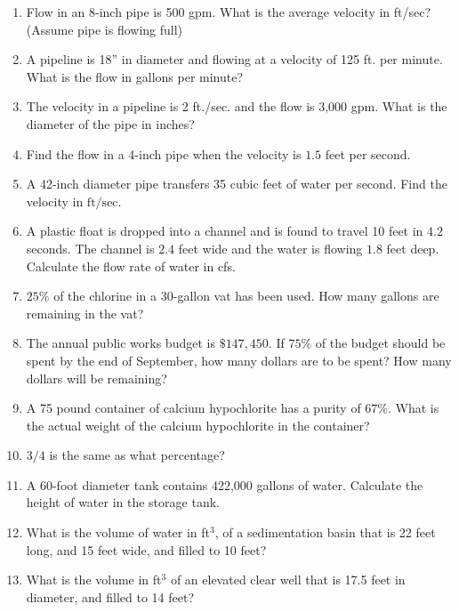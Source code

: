 \begin{enumerate}[1.]
\item Flow in an 8-inch pipe is 500 gpm. What is the average velocity in ft/sec? (Assume pipe is flowing full)

\item A pipeline is 18” in diameter and flowing at a velocity of 125 ft. per minute. What is the flow in gallons per minute?

\item The velocity in a pipeline is 2 ft./sec. and the flow is 3,000 gpm. What is the diameter of the pipe in inches?



\item Find the flow in a 4-inch pipe when the velocity is $1.5$ feet per second.

  \item A 42-inch diameter pipe transfers 35 cubic feet of water per second. Find the velocity in $\mathrm{ft} / \mathrm{sec}$. 
  
  \item A plastic float is dropped into a channel and is found to travel 10 feet in $4.2$ seconds. The channel is $2.4$ feet wide and the water is flowing $1.8$ feet deep. Calculate the flow rate of water in cfs.
  
\item $25 \%$ of the chlorine in a 30-gallon vat has been used. How many gallons are remaining in the vat?

\item The annual public works budget is $\$ 147,450$. If $75 \%$ of the budget should be spent by the end of September, how many dollars are to be spent? How many dollars will be remaining?

\item A 75 pound container of calcium hypochlorite has a purity of $67 \%$. What is the actual weight of the calcium hypochlorite in the container? 

\item $3 / 4$ is the same as what percentage?

\item A 60-foot diameter tank contains 422,000 gallons of water. Calculate the height of water in the storage tank.

\item What is the volume of water in ft$^3$, of a sedimentation basin that is 22 feet long, and 15 feet wide, and filled to 10 feet?

\item What is the volume in ft$^3$ of an elevated clear well that is 17.5 feet in diameter, and filled to 14 feet?


\end{enumerate}
